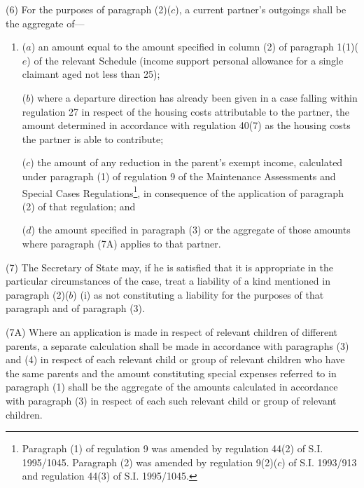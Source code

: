 \documentclass[12pt,a4paper]{article}
\begin{document}
(6) For the purposes of paragraph (2)($c$), a current partner’s outgoings shall be the aggregate of—
\begin{enumerate}\item[]
($a$) an amount equal to the amount specified in column (2) of paragraph 1(1)($e$) of the relevant Schedule (income support personal allowance for a single claimant aged not less than 25);

\begin{sloppypar}
($b$) where a departure direction has already been given in a case falling within
regulation 27 in respect of the housing costs attributable to the partner, the
amount determined in accordance with regulation 40(7) as the housing costs the
partner is able to contribute;
\end{sloppypar}

($c$) the amount of any reduction in the parent’s exempt income, calculated under
paragraph (1) of regulation 9 of the Maintenance Assessments and Special Cases
Regulations\footnote{\frenchspacing Paragraph (1) of regulation 9 was amended by regulation 44(2) of S.I. 1995/1045. Paragraph (2) was amended by regulation 9(2)($c$) of S.I. 1993/913 and regulation 44(3) of S.I. 1995/1045.}, in consequence of the application of paragraph (2) of that
regulation; and

($d$) the amount specified in paragraph (3)
or the aggregate of those amounts where paragraph (7A) applies to that partner.  %
\end{enumerate}

(7) The Secretary of State may, if he is satisfied that it is appropriate in the particular circumstances of the case, treat a liability of a kind mentioned in paragraph (2)($b$)%
(i)  %
as not constituting a liability for the purposes of that paragraph and of paragraph (3).

(7A) Where an application is made in respect of relevant children of different parents, a separate calculation shall be made in accordance with paragraphs (3) and (4) in respect of each relevant child or group of relevant children who have the same parents and the amount constituting special expenses referred to in paragraph (1) shall be the aggregate of the amounts calculated in accordance with paragraph (3) in respect of each such relevant child or group of relevant children.
\end{document}
